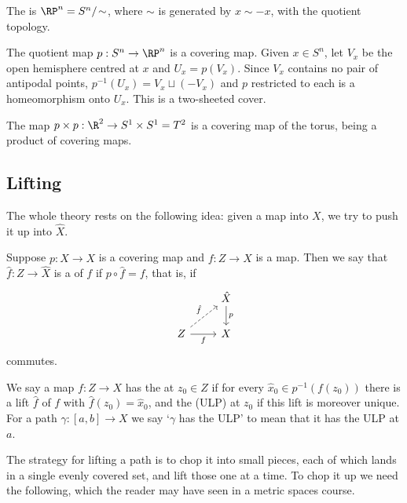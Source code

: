 \begin{definition}
	The  is $\RP^n = S^n/\!\sim$, where $\sim$ is generated by $x \sim -x$, with the quotient topology.
\end{definition}

\begin{example} \label{ex:rpn-cover}
	The quotient map $p: S^n \to \RP^n$ is a covering map. Given $x \in S^n$, let $V_x$ be the open hemisphere centred at $x$ and $U_x = p(V_x)$. Since $V_x$ contains no pair of antipodal points, $p^{-1}(U_x) = V_x \sqcup (-V_x)$ and $p$ restricted to each is a homeomorphism onto $U_x$. This is a two-sheeted cover.
\end{example}

\begin{example} \label{ex:torus-cover}
	The map $p \times p: \R^2 \to S^1 \times S^1 = T^2$ is a covering map of the torus, being a product of covering maps.
\end{example}

\subsection{Lifting}

The whole theory rests on the following idea: given a map into $X$, we try to push it up
into $\hat X$.

\begin{definition}[Lift]
	Suppose $p: \hat{X} \rightarrow X$ is a covering map and $f: Z \rightarrow X$ is a map. Then we say that $\hat{f}: Z \rightarrow \hat{X}$ is a  of $f$ if $p \circ \hat{f}=f$, that is, if
	\[\begin{tikzcd}
		& {\hat X} \arrow[d, "p"] \\
		Z \arrow[ru, "{\hat f}", dashed] \arrow[r, "f"'] & X
	\end{tikzcd}\]
	commutes.
\end{definition}

\begin{notation}
	We say a map $f: Z \to X$ has the  at $z_0 \in Z$ if for every $\hat{x}_0 \in p^{-1}(f(z_0))$ there is a lift $\hat f$ of $f$ with $\hat{f}(z_0) = \hat{x}_0$, and the  (ULP) at $z_0$ if this lift is moreover unique. For a path $\gamma: [a,b] \to X$ we say `$\gamma$ has the ULP' to mean that it has the ULP at $a$.
\end{notation}

The strategy for lifting a path is to chop it into small pieces, each of which lands in a
single evenly covered set, and lift those one at a time. To chop it up we need the
following, which the reader may have seen in a metric spaces course.

